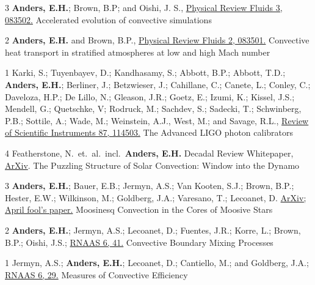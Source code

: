 	  {3}
	  {
		  \textbf{Anders, E.H.}; Brown, B.P; and Oishi, J. S.,
		  \href{https://journals.aps.org/prfluids/abstract/10.1103/PhysRevFluids.3.083502}{Physical Review Fluids 3, 083502.}
	  }
	  {Accelerated evolution of convective simulations}

	  {2}
	  {
		  \textbf{Anders, E.H.} and Brown, B.P.,
		  \href{https://journals.aps.org/prfluids/abstract/10.1103/PhysRevFluids.2.083501}{Physical Review Fluids 2, 083501.}
	  }
	  {Convective heat transport in stratified atmospheres at low and high Mach number}

	  {1}
	  {
			Karki, S.; Tuyenbayev, D.; Kandhasamy, S.; Abbott, B.P.; Abbott, T.D.; \textbf{Anders, E.H.};
			Berliner, J.; Betzwieser, J.; Cahillane, C.; Canete, L.; Conley, C.; Daveloza, H.P.; De Lillo, N.;
			Gleason, J.R.; Goetz, E.; Izumi, K.; Kissel, J.S.; Mendell, G.; Quetschke, V; Rodruck, M.; Sachdev, S.;
			Sadecki, T.; Schwinberg, P.B.; Sottile, A.; Wade, M.; Weinstein, A.J., West, M.; and Savage, R.L.,
			\href{https://aip.scitation.org/doi/10.1063/1.4967303}{Review of Scientific Instruments 87, 114503.}
	  }
	  {The Advanced LIGO photon calibrators}

\vspace{0.3cm}
	  {4}
	  {
		Featherstone, N.~et.~al.~incl.~\textbf{Anders, E.H.}
        Decadal Review Whitepaper, \href{https://arxiv.org/abs/2305.08823}{ArXiv}. 
	  }
	  {
            The Puzzling Structure of Solar Convection: Window into the Dynamo
      }


\cvpub{}
	  {3}
	  {
		\textbf{Anders, E.H.}; Bauer, E.B.; Jermyn, A.S.; Van Kooten, S.J.; Brown, B.P.; Hester, E.W.; Wilkinson, M.; Goldberg, J.A.; Varesano, T.; Lecoanet, D.
        \href{https://arxiv.org/abs/2204.00002}{ArXiv; April fool's paper.}
	  }
	  {Moosinesq Convection in the Cores of Moosive Stars}

\cvpub{}
	  {2}
	  {
		\textbf{Anders, E.H.}; Jermyn, A.S.; Lecoanet, D.; Fuentes, J.R.; Korre, L.; Brown, B.P.; Oishi, J.S.; 
        \href{https://iopscience.iop.org/article/10.3847/2515-5172/ac5892}{RNAAS 6, 41.}
	  }
	  {Convective Boundary Mixing Processes}

\cvpub{}
	  {1}
	  {
		Jermyn, A.S.; \textbf{Anders, E.H.}; Lecoanet, D.; Cantiello, M.; and Goldberg, J.A.; 
        \href{https://iopscience.iop.org/article/10.3847/2515-5172/ac531e}{RNAAS 6, 29.}
	  }
	  {Measures of Convective Efficiency}


